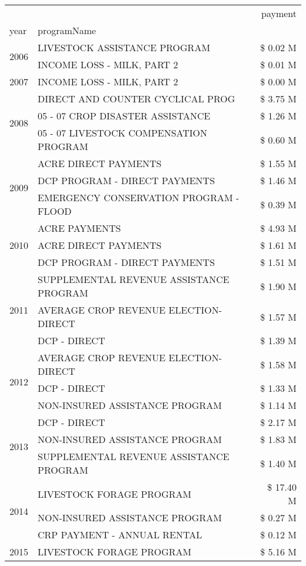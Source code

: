 \begin{tabular}{llr}
\toprule
 &  & payment \\
year & programName &  \\
\midrule
\multirow[t]{2}{*}{2006} & LIVESTOCK ASSISTANCE PROGRAM & \$ 0.02 M \\
 & INCOME LOSS - MILK, PART 2 & \$ 0.01 M \\
\cline{1-3}
2007 & INCOME LOSS - MILK, PART 2 & \$ 0.00 M \\
\cline{1-3}
\multirow[t]{3}{*}{2008} & DIRECT AND COUNTER CYCLICAL PROG & \$ 3.75 M \\
 & 05 - 07 CROP DISASTER ASSISTANCE & \$ 1.26 M \\
 & 05 - 07 LIVESTOCK COMPENSATION PROGRAM & \$ 0.60 M \\
\cline{1-3}
\multirow[t]{3}{*}{2009} & ACRE DIRECT PAYMENTS & \$ 1.55 M \\
 & DCP PROGRAM - DIRECT PAYMENTS & \$ 1.46 M \\
 & EMERGENCY CONSERVATION PROGRAM - FLOOD & \$ 0.39 M \\
\cline{1-3}
\multirow[t]{3}{*}{2010} & ACRE PAYMENTS & \$ 4.93 M \\
 & ACRE DIRECT PAYMENTS & \$ 1.61 M \\
 & DCP PROGRAM - DIRECT PAYMENTS & \$ 1.51 M \\
\cline{1-3}
\multirow[t]{3}{*}{2011} & SUPPLEMENTAL REVENUE ASSISTANCE PROGRAM & \$ 1.90 M \\
 & AVERAGE CROP REVENUE ELECTION-DIRECT & \$ 1.57 M \\
 & DCP - DIRECT & \$ 1.39 M \\
\cline{1-3}
\multirow[t]{3}{*}{2012} & AVERAGE CROP REVENUE ELECTION-DIRECT & \$ 1.58 M \\
 & DCP - DIRECT & \$ 1.33 M \\
 & NON-INSURED ASSISTANCE PROGRAM & \$ 1.14 M \\
\cline{1-3}
\multirow[t]{3}{*}{2013} & DCP - DIRECT & \$ 2.17 M \\
 & NON-INSURED ASSISTANCE PROGRAM & \$ 1.83 M \\
 & SUPPLEMENTAL REVENUE ASSISTANCE PROGRAM & \$ 1.40 M \\
\cline{1-3}
\multirow[t]{3}{*}{2014} & LIVESTOCK FORAGE PROGRAM & \$ 17.40 M \\
 & NON-INSURED ASSISTANCE PROGRAM & \$ 0.27 M \\
 & CRP PAYMENT - ANNUAL RENTAL & \$ 0.12 M \\
\cline{1-3}
\multirow[t]{3}{*}{2015} & LIVESTOCK FORAGE PROGRAM & \$ 5.16 M \\

\end{tabular}
